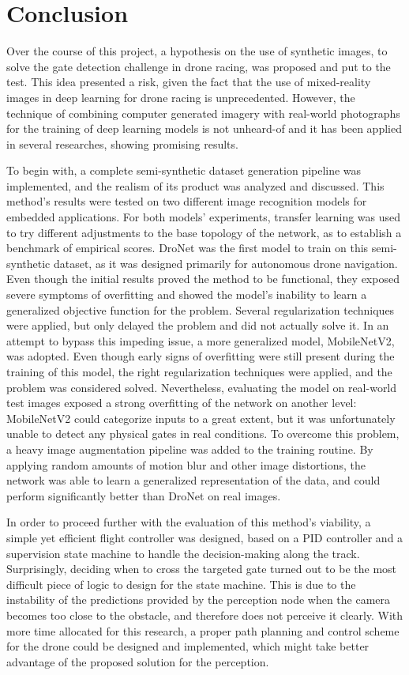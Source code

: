 \chapter{Conclusion}

Over the course of this project, a hypothesis on the use of synthetic images,
to solve the gate detection challenge in drone racing, was proposed and put
to the test. This idea presented a risk, given the fact that the use of
mixed-reality images in deep learning for drone racing is unprecedented.
However, the technique of combining computer generated imagery with real-world
photographs for the training of deep learning models is not unheard-of and it
has been applied in several researches, showing promising results.

To begin with, a complete semi-synthetic dataset generation pipeline was
implemented, and the realism of its product was analyzed and discussed.
This method's results were tested on two different image recognition models for
embedded applications.
For both models' experiments, transfer learning was used to try
different adjustments to the base topology of the network, as to establish a
benchmark of empirical scores.
DroNet was the first model to train on this semi-synthetic dataset, as it was
designed primarily for autonomous drone navigation. Even though the initial
results proved the method to be functional, they exposed severe symptoms of
overfitting and showed the model's inability to learn a generalized objective
function for the problem. Several regularization techniques were applied, but
only delayed the problem and did not actually solve it. In an attempt to bypass
this impeding issue, a more generalized model, MobileNetV2, was adopted. Even
though early signs of overfitting were still present during the training of
this model, the right regularization techniques were applied, and the problem
was considered solved. Nevertheless, evaluating the model on real-world test
images exposed a strong overfitting of the network on another level:
MobileNetV2 could categorize inputs to a great extent, but it was unfortunately
unable to detect any physical gates in real conditions. To overcome this
problem, a heavy image augmentation pipeline was added to the training routine.
By applying random amounts of motion blur and other image distortions, the
network was able to learn a generalized representation of the data, and could
perform significantly better than DroNet on real images.

In order to proceed further with the evaluation of this method's viability, a
simple yet efficient flight controller was designed, based on a PID controller
and a supervision state machine to handle the decision-making along the track. 
Surprisingly, deciding when to cross the targeted gate turned out to be the
most difficult piece of logic to design for the state machine. This is due to
the instability of the predictions provided by the perception node when the
camera becomes too close to the obstacle, and therefore does not perceive it
clearly. With more time allocated for this research, a proper path planning
and control scheme for the drone could be designed and implemented, which might
take better advantage of the proposed solution for the perception.

